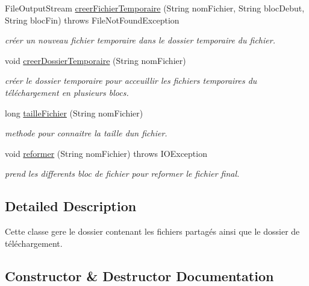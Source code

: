 \begin{DoxyCompactItemize}
File\+Output\+Stream \hyperlink{classcommon_1_1GestionnaireFichier_a3bdc681e581824bba5c4463c680e4d29}{creer\+Fichier\+Temporaire} (String nom\+Fichier, String bloc\+Debut, String bloc\+Fin)  throws File\+Not\+Found\+Exception
\begin{DoxyCompactList}\small\item\em créer un nouveau fichier temporaire dans le dossier temporaire du fichier. \end{DoxyCompactList}\item 
void \hyperlink{classcommon_1_1GestionnaireFichier_aa32c12e7c7269b4142b4f93dc89603b7}{creer\+Dossier\+Temporaire} (String nom\+Fichier)
\begin{DoxyCompactList}\small\item\em créer le dossier temporaire pour acceuillir les fichiers temporaires du téléchargement en plusieurs blocs. \end{DoxyCompactList}\item 
long \hyperlink{classcommon_1_1GestionnaireFichier_afc70adcceabf46a5721ff2b1149e2730}{taille\+Fichier} (String nom\+Fichier)
\begin{DoxyCompactList}\small\item\em methode pour connaitre la taille d\textquotesingle{}un fichier. \end{DoxyCompactList}\item 
void \hyperlink{classcommon_1_1GestionnaireFichier_af554d6cc45505271d3f393feb7b5e0f6}{reformer} (String nom\+Fichier)  throws I\+O\+Exception 
\begin{DoxyCompactList}\small\item\em prend les differents bloc de fichier pour reformer le fichier final. \end{DoxyCompactList}\end{DoxyCompactItemize}


\subsection{Detailed Description}
Cette classe gere le dossier contenant les fichiers partagés ainsi que le dossier de téléchargement. 

\subsection{Constructor \& Destructor Documentation}
\mbox{\label{classcommon_1_1GestionnaireFichier_af063deb28fa952a2d0c605bc26659b16}} 
